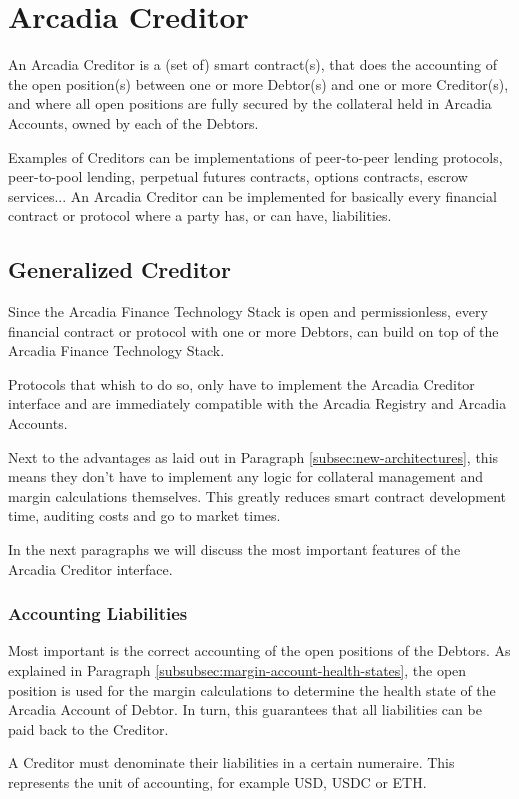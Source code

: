 \documentclass[sigconf,nonacm]{acmart}
\begin{document}
\section{Arcadia Creditor}
\label{sec:arcadia-creditor}
An Arcadia Creditor is a (set of) smart contract(s),
that does the accounting of the open position(s) between one or more Debtor(s) and one or more Creditor(s),
and where all open positions are fully secured by the collateral held in Arcadia Accounts,
owned by each of the Debtors.

Examples of Creditors can be implementations of peer-to-peer lending protocols, peer-to-pool lending, perpetual futures contracts, options contracts, escrow services...
An Arcadia Creditor can be implemented for basically every financial contract or protocol where a party has, or can have, liabilities.

\subsection{Generalized Creditor}
Since the Arcadia Finance Technology Stack is open and permissionless,
every financial contract or protocol with one or more Debtors,
can build on top of the Arcadia Finance Technology Stack.

Protocols that whish to do so, only have to implement the Arcadia Creditor interface
and are immediately compatible with the Arcadia Registry and Arcadia Accounts.

Next to the advantages as laid out in Paragraph \ref{subsec:new-architectures},
this means they don't have to implement any logic for collateral management and margin calculations themselves.
This greatly reduces smart contract development time, auditing costs and go to market times.

In the next paragraphs we will discuss the most important features of the Arcadia Creditor interface.

\subsubsection{Accounting Liabilities}
Most important is the correct accounting of the open positions of the Debtors.
As explained in Paragraph \ref{subsubsec:margin-account-health-states},
the open position is used for the margin calculations to determine the health state of the Arcadia Account of Debtor.
In turn, this guarantees that all liabilities can be paid back to the Creditor.

A Creditor must denominate their liabilities in a certain numeraire.
This represents the unit of accounting, for example USD, USDC or ETH.
\end{document}
